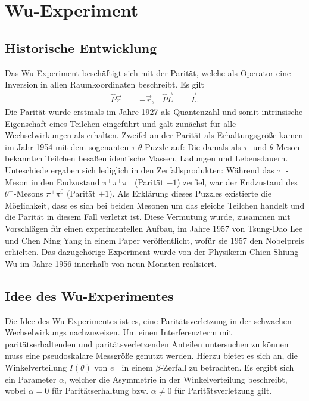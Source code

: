
\section{Wu-Experiment}


\subsection{Historische Entwicklung}
Das Wu-Experiment beschäftigt sich mit der Parität, welche als Operator eine Inversion in allen Raumkoordinaten beschreibt. Es gilt
\begin{align*}
	\hat{P} \vec{r} &= -\vec{r}, &
	\hat{P} \vec{L} &= \vec{L}.
\end{align*}
Die Parität wurde erstmals im Jahre 1927 als Quantenzahl und somit intrinsische Eigenschaft eines Teilchen eingeführt und galt zunächst für alle Wechselwirkungen als erhalten.
Zweifel an der Parität als Erhaltungsgröße kamen im Jahr 1954 mit dem sogenanten $\tau$-$\theta$-Puzzle auf:
Die damals als $\tau$- und $\theta$-Meson bekannten Teilchen besaßen identische Massen, Ladungen und Lebensdauern.
Unteschiede ergaben sich lediglich in den Zerfallsprodukten:
Während das $\tau^+$-Meson in den Endzustand $\pi^+ \pi^+ \pi^-$ (Parität $-1$) zerfiel, war der Endzustand des $\theta^+$-Mesons $\pi^+ \pi^0$ (Parität $+1$).
Als Erklärung dieses Puzzles existierte die Möglichkeit, dass es sich bei beiden Mesonen um das gleiche Teilchen handelt und die Parität in diesem Fall verletzt ist.
Diese Vermutung wurde, zusammen mit Vorschlägen für einen experimentellen Aufbau, im Jahre 1957 von Tsung-Dao Lee und Chen Ning Yang in einem Paper veröffentlicht, wofür sie 1957 den Nobelpreis erhielten.
Das dazugehörige Experiment wurde von der Physikerin Chien-Shiung Wu im Jahre 1956 innerhalb von neun Monaten realisiert.

\subsection{Idee des Wu-Experimentes}
Die Idee des Wu-Experimentes ist es, eine Paritätsverletzung in der schwachen Wechselwirkungs nachzuweisen.
Um einen Interferenzterm mit paritätserhaltenden und paritätsverletzenden Anteilen untersuchen zu können muss eine pseudoskalare Messgröße genutzt werden.
Hierzu bietet es sich an, die Winkelverteilung $I\left(\theta \right)$ von $e^-$ in einem $\beta$-Zerfall zu betrachten. 
Es ergibt sich ein Parameter $\alpha$, welcher die Asymmetrie in der Winkelverteilung beschreibt, wobei $\alpha = 0$ für Paritätserhaltung bzw. $\alpha \neq 0$ für Paritätsverletzung gilt.


